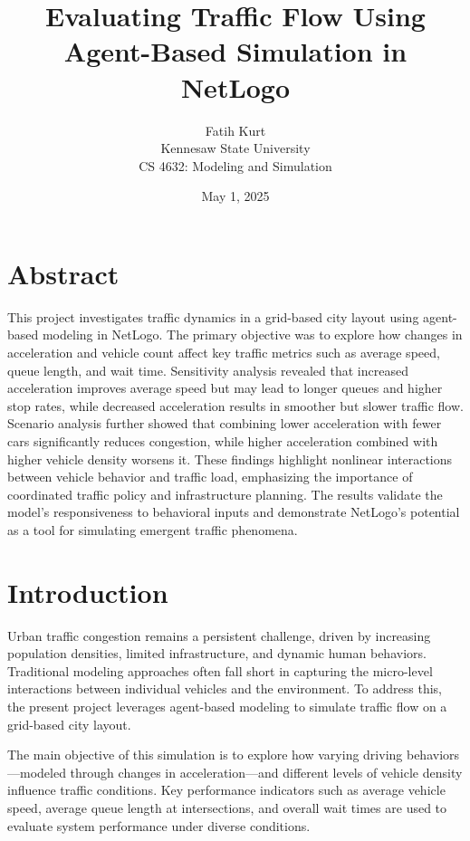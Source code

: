 \documentclass[12pt]{article}
\title{Evaluating Traffic Flow Using Agent-Based Simulation in NetLogo}
\author{Fatih Kurt \\
Kennesaw State University \\
CS 4632: Modeling and Simulation}
\date{May 1, 2025}
\begin{document}
\maketitle

\newpage

\tableofcontents

\newpage
\section{Abstract}

This project investigates traffic dynamics in a grid-based city layout using agent-based modeling in NetLogo. The primary objective was to explore how changes in acceleration and vehicle count affect key traffic metrics such as average speed, queue length, and wait time. Sensitivity analysis revealed that increased acceleration improves average speed but may lead to longer queues and higher stop rates, while decreased acceleration results in smoother but slower traffic flow. Scenario analysis further showed that combining lower acceleration with fewer cars significantly reduces congestion, while higher acceleration combined with higher vehicle density worsens it. These findings highlight nonlinear interactions between vehicle behavior and traffic load, emphasizing the importance of coordinated traffic policy and infrastructure planning. The results validate the model's responsiveness to behavioral inputs and demonstrate NetLogo’s potential as a tool for simulating emergent traffic phenomena.

\newpage
\section{Introduction}

Urban traffic congestion remains a persistent challenge, driven by increasing population densities, limited infrastructure, and dynamic human behaviors. Traditional modeling approaches often fall short in capturing the micro-level interactions between individual vehicles and the environment. To address this, the present project leverages agent-based modeling to simulate traffic flow on a grid-based city layout.

The main objective of this simulation is to explore how varying driving behaviors—modeled through changes in acceleration—and different levels of vehicle density influence traffic conditions. Key performance indicators such as average vehicle speed, average queue length at intersections, and overall wait times are used to evaluate system performance under diverse conditions.
\end{document}
